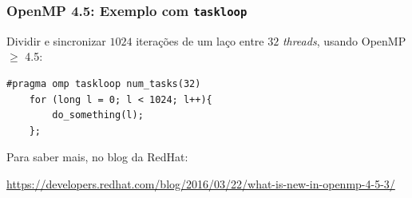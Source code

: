 \documentclass[10pt, compress]{beamer}
\begin{document}
\begin{frame}[fragile]
    \frametitle{OpenMP 4.5: Exemplo com \texttt{taskloop}}
    \alert{Dividir e sincronizar} $1024$ iterações de um laço entre $32$
    \textit{threads}, usando \alert{OpenMP $\geq$ 4.5}:

    \begin{lstlisting}[basicstyle=\ttfamily\scriptsize]
    #pragma omp taskloop num_tasks(32)
    for (long l = 0; l < 1024; l++){
        do_something(l);
    };
    \end{lstlisting}

    \pause

    Para saber mais, no \alert{blog da RedHat}:
    \begin{center}
        \scriptsize{\url{https://developers.redhat.com/blog/2016/03/22/what-is-new-in-openmp-4-5-3/}}
    \end{center}
\end{frame}

\maketitle
\end{document}
